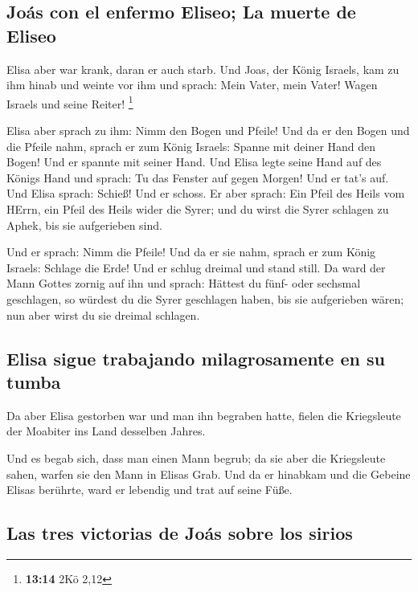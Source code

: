 \hypertarget{jouxe1s-con-el-enfermo-eliseo-la-muerte-de-eliseo}{%
\subsection{Joás con el enfermo Eliseo; La muerte de
Eliseo}\label{jouxe1s-con-el-enfermo-eliseo-la-muerte-de-eliseo}}

 Elisa aber war krank, daran er auch starb. Und Joas, der
König Israels, kam zu ihm hinab und weinte vor ihm und sprach: Mein
Vater, mein Vater! Wagen Israels und seine Reiter! \footnote{\textbf{13:14}
  2Kö 2,12}

 Elisa aber sprach zu ihm: Nimm den Bogen und Pfeile! Und
da er den Bogen und die Pfeile nahm,  sprach er zum König
Israels: Spanne mit deiner Hand den Bogen! Und er spannte mit seiner
Hand. Und Elisa legte seine Hand auf des Königs Hand  und
sprach: Tu das Fenster auf gegen Morgen! Und er tat's auf. Und Elisa
sprach: Schieß! Und er schoss. Er aber sprach: Ein Pfeil des Heils vom
HErrn, ein Pfeil des Heils wider die Syrer; und du wirst die Syrer
schlagen zu Aphek, bis sie aufgerieben sind.

 Und er sprach: Nimm die Pfeile! Und da er sie nahm,
sprach er zum König Israels: Schlage die Erde! Und er schlug dreimal und
stand still.  Da ward der Mann Gottes zornig auf ihn und
sprach: Hättest du fünf- oder sechsmal geschlagen, so würdest du die
Syrer geschlagen haben, bis sie aufgerieben wären; nun aber wirst du sie
dreimal schlagen.

\hypertarget{elisa-sigue-trabajando-milagrosamente-en-su-tumba}{%
\subsection{Elisa sigue trabajando milagrosamente en su
tumba}\label{elisa-sigue-trabajando-milagrosamente-en-su-tumba}}

 Da aber Elisa gestorben war und man ihn begraben hatte,
fielen die Kriegsleute der Moabiter ins Land desselben Jahres.

 Und es begab sich, dass man einen Mann begrub; da sie
aber die Kriegsleute sahen, warfen sie den Mann in Elisas Grab. Und da
er hinabkam und die Gebeine Elisas berührte, ward er lebendig und trat
auf seine Füße.

\hypertarget{las-tres-victorias-de-jouxe1s-sobre-los-sirios}{%
\subsection{Las tres victorias de Joás sobre los
sirios}\label{las-tres-victorias-de-jouxe1s-sobre-los-sirios}}

